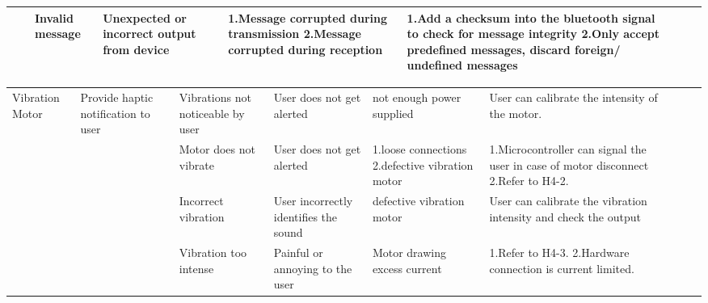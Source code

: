 \documentclass{article}
\begin{document}
\begin{table}[H]
\begin{tabular}{| p{} | p{}  | p{} | p{} | p{} | p{} | p{} | p{} | p{} |}
     & & Invalid message & Unexpected or incorrect output from device & 1.Message corrupted during transmission \newline 2.Message corrupted during reception & 1.Add a checksum into the bluetooth signal to check for message integrity \newline 2.Only accept predefined messages, discard foreign/ undefined messages &  &  &  \\ \hline
    
    \end{tabular}
    \end{table}

\newpage
\begin{table}[H]
\begin{tabular}{| p{} | p{}  | p{} | p{} | p{} | p{} | p{} | p{} | p{} |}
    \hline 
    Vibration Motor & Provide haptic notification to user & Vibrations not noticeable by user & User does not get alerted & not enough power supplied & User can calibrate the intensity of the motor. &  &  &  \\ \cline{3-9}

    & & Motor does not vibrate & User does not get alerted & 1.loose connections \newline 2.defective vibration motor  & 1.Microcontroller can signal the user in case of motor disconnect \newline 2.Refer to  H4-2.  &  &  &  \\ \cline{3-9}

    & & Incorrect vibration & User incorrectly identifies the sound & defective vibration motor & User can calibrate the vibration intensity and check the output  &  &  &  \\ \cline{3-9}

    & & Vibration too intense & Painful or annoying to the user & Motor drawing excess current & 1.Refer to H4-3. \newline 2.Hardware connection is current limited.  &  &  &  \\ \hline

\end{tabular} 
\end {table}

\newpage
\end{document}
